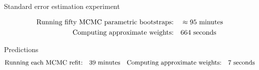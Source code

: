 

\begin{frame}[t]{Standard error estimation experiment}

\wholeslidefig{\BootstrapPlot{}}

\pause
$$
\begin{aligned}
    \textrm{Running fifty MCMC parametric bootstraps:}\quad & \approx 95 \textrm{ minutes} \\
    \textrm{Computing approximate weights:}\quad &664 \textrm{ seconds}\\
\end{aligned}
$$
\end{frame}





\begin{frame}[t]{Predictions}
    \LaxRefitPlot{}
    \vspace{-3em}
    $$
    \begin{aligned}
        \textrm{Running each MCMC refit:}\quad & 39 \textrm{ minutes} &
        \textrm{Computing approximate weights:}\quad &7 \textrm{ seconds}\\
    \end{aligned}
    $$
\end{frame}








\def\res{\varepsilon}
\def\w{w}
\def\wtil{\tilde{\w}}
\def\reshat{\hat{\res}}

\def\methodrow#1#2#3{
\begin{minipage}[t]{0.15\textwidth}
    \centering
    #1
\end{minipage}
\hfill
\begin{minipage}[t]{0.4\textwidth}
    \centering
    \vspace{-2em}
    #2
    \pause
\end{minipage}
\hfill
\begin{minipage}[t]{0.4\textwidth}
    \centering
    \vspace{-2em}
    #3
    \pause
\end{minipage}
}


